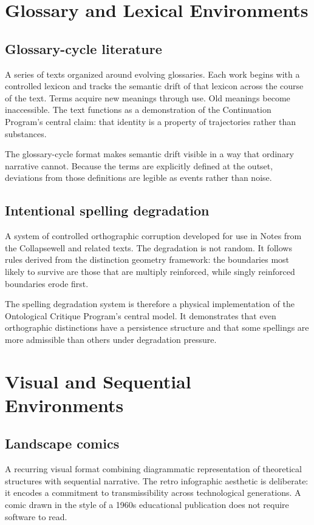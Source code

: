 \documentclass[12pt, openany]{book}
\begin{document}
\section{Glossary and Lexical Environments}

\subsection{Glossary-cycle literature} A series of texts organized around
evolving glossaries. Each work begins with a controlled lexicon and tracks
the semantic drift of that lexicon across the course of the text. Terms
acquire new meanings through use. Old meanings become inaccessible. The
text functions as a demonstration of the Continuation Program's central
claim: that identity is a property of trajectories rather than substances.

The glossary-cycle format makes semantic drift visible in a way that
ordinary narrative cannot. Because the terms are explicitly defined at the
outset, deviations from those definitions are legible as events rather than
noise.

\subsection{Intentional spelling degradation} A system of controlled
orthographic corruption developed for use in Notes from the Collapsewell
and related texts. The degradation is not random. It follows rules derived
from the distinction geometry framework: the boundaries most likely to
survive are those that are multiply reinforced, while singly reinforced
boundaries erode first.

The spelling degradation system is therefore a physical implementation of
the Ontological Critique Program's central model. It demonstrates that
even orthographic distinctions have a persistence structure and that some
spellings are more admissible than others under degradation pressure.

\section{Visual and Sequential Environments}

\subsection{Landscape comics} A recurring visual format combining
diagrammatic representation of theoretical structures with sequential
narrative. The retro infographic aesthetic is deliberate: it encodes a
commitment to transmissibility across technological generations. A comic
drawn in the style of a 1960s educational publication does not require
software to read.
\end{document}
